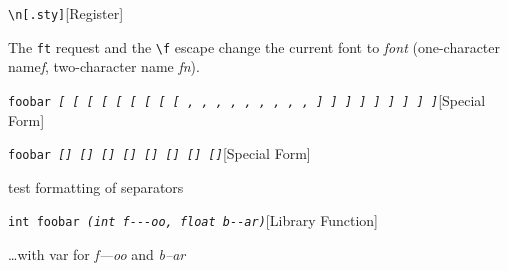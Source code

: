 \documentclass{book}
\begin{document}
%
\noindent\texttt{\texttt{\textbackslash{}n[.sty]}}\hfill[Register]



%
The \texttt{ft} request and the \texttt{\textbackslash{}f} escape change the current font
to \textsl{font} (one-character name\hbox{}\textsl{f}, two-character name
\textsl{fn}).

\noindent\texttt{foobar \EmbracOn{}\textsl{[ \EmbracOff{}\textnormal{[}\EmbracOn{} \EmbracOff{}\textsl{[}\EmbracOn{} \EmbracOff{}\texttt{[}\EmbracOn{} \EmbracOff{}\texttt{[}\EmbracOn{} \EmbracOff{}\textnormal{\textsl{[}}\EmbracOn{} \EmbracOff{}\textnormal{\texttt{[}}\EmbracOn{} \EmbracOff{}\textnormal{\texttt{\textsl{[}}}\EmbracOn{} \EmbracOff{}\textnormal{\texttt{[}}\EmbracOn{} , \EmbracOff{}\textnormal{,}\EmbracOn{} \EmbracOff{}\textsl{,}\EmbracOn{} \EmbracOff{}\texttt{,}\EmbracOn{} \EmbracOff{}\texttt{,}\EmbracOn{} \EmbracOff{}\textnormal{\textsl{,}}\EmbracOn{} \EmbracOff{}\textnormal{\texttt{,}}\EmbracOn{} \EmbracOff{}\textnormal{\texttt{\textsl{,}}}\EmbracOn{} \EmbracOff{}\textnormal{\texttt{,}}\EmbracOn{} ] \EmbracOff{}\textnormal{]}\EmbracOn{} \EmbracOff{}\textsl{]}\EmbracOn{} \EmbracOff{}\texttt{]}\EmbracOn{} \EmbracOff{}\texttt{]}\EmbracOn{} \EmbracOff{}\textnormal{\textsl{]}}\EmbracOn{} \EmbracOff{}\textnormal{\texttt{]}}\EmbracOn{} \EmbracOff{}\textnormal{\texttt{\textsl{]}}}\EmbracOn{} \EmbracOff{}\textnormal{\texttt{]}}\EmbracOn{}}}\hfill[Special Form]



%
\noindent\texttt{foobar \EmbracOn{}\textsl{[] \EmbracOff{}\textnormal{[]}\EmbracOn{} \EmbracOff{}\textsl{[]}\EmbracOn{} \EmbracOff{}\texttt{[]}\EmbracOn{} \EmbracOff{}\texttt{[]}\EmbracOn{} \EmbracOff{}\textnormal{\textsl{[]}}\EmbracOn{} \EmbracOff{}\textnormal{\texttt{[]}}\EmbracOn{} \EmbracOff{}\textnormal{\texttt{\textsl{[]}}}\EmbracOn{}}}\hfill[Special Form]



%
test formatting of separators

\noindent\texttt{int foobar \EmbracOn{}\textsl{(int \EmbracOff{}\textsl{f{-}{-}{-}oo}\EmbracOn{}, float \EmbracOff{}\textsl{b{-}{-}ar}\EmbracOn{})}}\hfill[Library Function]



%
\dots{}\@ with var for \textsl{f---oo} and \textsl{b--ar}
\end{document}
